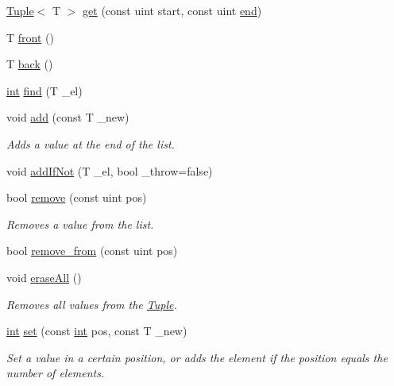 \begin{DoxyCompactItemize}
\mbox{\hyperlink{class_tuple}{Tuple}}$<$ T $>$ \mbox{\hyperlink{class_tuple_a7cd0c2fb33a5861e3f171614881393ce}{get}} (const uint start, const uint \mbox{\hyperlink{class_tuple_a345d8a3efbf58fe4cc7295c3cf66e8ab}{end}})
\item 
T \mbox{\hyperlink{class_tuple_a3f97540a70c1e40e3a34c1b5dee9fa0e}{front}} ()
\item 
T \mbox{\hyperlink{class_tuple_ad885e206e13107c8f4c6005216f5da29}{back}} ()
\item 
\mbox{\hyperlink{draw_8hh_aa620a13339ac3a1177c86edc549fda9b}{int}} \mbox{\hyperlink{class_tuple_aab743167e9fd750f71add11b1aa48f6b}{find}} (T \+\_\+el)
\item 
void \mbox{\hyperlink{class_tuple_a5d3ee2809d790543195a6e2075aef7d0}{add}} (const T \+\_\+new)
\begin{DoxyCompactList}\small\item\em Adds a value at the end of the list. \end{DoxyCompactList}\item 
void \mbox{\hyperlink{class_tuple_ac7699d6813e11c18f436098e9f76ebf0}{add\+If\+Not}} (T \+\_\+el, bool \+\_\+throw=false)
\item 
bool \mbox{\hyperlink{class_tuple_ad7436ece54558c2940f79c539f83f611}{remove}} (const uint pos)
\begin{DoxyCompactList}\small\item\em Removes a value from the list. \end{DoxyCompactList}\item 
bool \mbox{\hyperlink{class_tuple_a60370cde243871dfafb0ac96404c6f90}{remove\+\_\+from}} (const uint pos)
\item 
void \mbox{\hyperlink{class_tuple_ae36c533bd6e97ac45a2ed69a0c4760e4}{erase\+All}} ()
\begin{DoxyCompactList}\small\item\em Removes all values from the {\ttfamily \mbox{\hyperlink{class_tuple}{Tuple}}}. \end{DoxyCompactList}\item 
\mbox{\hyperlink{draw_8hh_aa620a13339ac3a1177c86edc549fda9b}{int}} \mbox{\hyperlink{class_tuple_a6ecd34c0308891b7bec87b4736a6eaa5}{set}} (const \mbox{\hyperlink{draw_8hh_aa620a13339ac3a1177c86edc549fda9b}{int}} pos, const T \+\_\+new)
\begin{DoxyCompactList}\small\item\em Set a value in a certain position, or adds the element if the position equals the number of elements. \end{DoxyCompactList}\item 

\end{DoxyCompactItemize}
